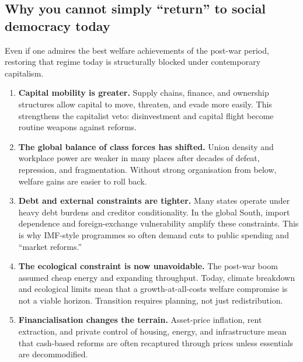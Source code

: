 \subsection{Why you cannot simply ``return'' to social democracy today}
\label{subsec:no-return-socdem}

Even if one admires the best welfare achievements of the post-war period, restoring that regime today is structurally
blocked under contemporary capitalism.

\begin{enumerate}[leftmargin=1.5em]
  \item \textbf{Capital mobility is greater.} Supply chains, finance, and ownership structures allow capital to move,
  threaten, and evade more easily. This strengthens the capitalist veto: disinvestment and capital flight become routine
  weapons against reforms.

  \item \textbf{The global balance of class forces has shifted.} Union density and workplace power are weaker in many
  places after decades of defeat, repression, and fragmentation. Without strong organisation from below, welfare gains
  are easier to roll back.

  \item \textbf{Debt and external constraints are tighter.} Many states operate under heavy debt burdens and creditor
  conditionality. In the global South, import dependence and foreign-exchange vulnerability amplify these constraints.
  This is why IMF-style programmes so often demand cuts to public spending and ``market reforms.''

  \item \textbf{The ecological constraint is now unavoidable.} The post-war boom assumed cheap energy and expanding
  throughput. Today, climate breakdown and ecological limits mean that a growth-at-all-costs welfare compromise is not
  a viable horizon.\cite{IPCCAR6WGIII} Transition requires planning, not just redistribution.

  \item \textbf{Financialisation changes the terrain.} Asset-price inflation, rent extraction, and private control of
  housing, energy, and infrastructure mean that cash-based reforms are often recaptured through prices unless essentials
  are decommodified.
\end{enumerate}


